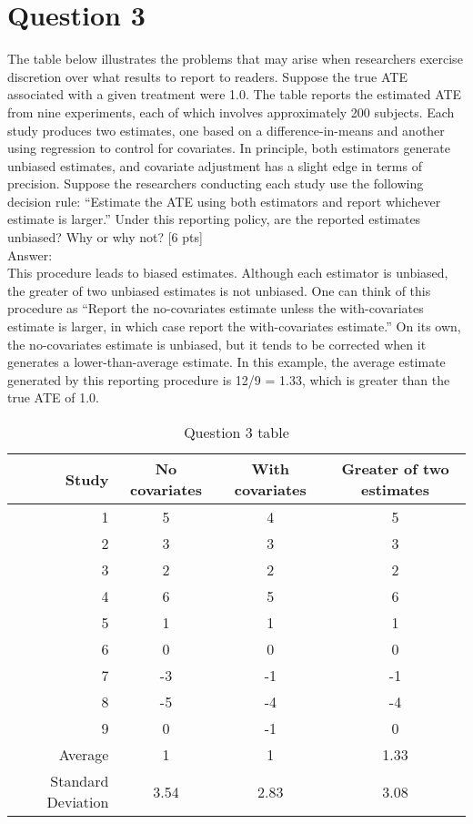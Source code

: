 \documentclass[11pt,notitlepage]{article}\usepackage[]{graphicx}\usepackage[]{color}
\begin{document}
\section*{Question 3}
The table below illustrates the problems that may arise when researchers exercise discretion over what results to report to readers. Suppose the true ATE associated with a given treatment were 1.0. The table reports the estimated ATE from nine experiments, each of which involves approximately 200 subjects. Each study produces two estimates, one based on a difference-in-means and another using regression to control for covariates. In principle, both estimators generate unbiased estimates, and covariate adjustment has a slight edge in terms of precision. Suppose the researchers conducting each study use the following decision rule: ``Estimate the ATE using both estimators and report whichever estimate is larger.'' Under this reporting policy, are the reported estimates unbiased? Why or why not? [6 pts]\\
Answer:\\
This procedure leads to biased estimates. Although each estimator is unbiased, the greater of two unbiased estimates is not unbiased. One can think of this procedure as ``Report the no-covariates estimate unless the with-covariates estimate is larger, in which case report the with-covariates estimate.'' On its own, the no-covariates estimate is unbiased, but it tends to be corrected when it generates a lower-than-average estimate. In this example, the average estimate generated by this reporting procedure is 12/9 = 1.33, which is greater than the true ATE of 1.0.

\begin{table}[H]
  \centering
  \caption{Question 3 table}
    \begin{tabular}{r|cc|c}
    \toprule
   \multicolumn{1}{r}{Study} & No covariates & \multicolumn{1}{c}{With covariates} & \multicolumn{1}{c}{Greater of two estimates} \\
    \midrule
    1     & 5     & 4     & 5 \\
    2     & 3     & 3     & 3 \\
    3     & 2     & 2     & 2 \\
    4     & 6     & 5     & 6 \\
    5     & 1     & 1     & 1 \\
    6     & 0     & 0     & 0 \\
    7     & -3    & -1    & -1 \\
    8     & -5    & -4    & -4 \\
    9     & 0     & -1    & 0 \\ \midrule
    Average & 1     & 1     & 1.33 \\
    Standard Deviation & 3.54  & 2.83  & 3.08 \\
    \bottomrule
    \end{tabular}%
  \label{tab:addlabel}%
\end{table}%
\end{document}
